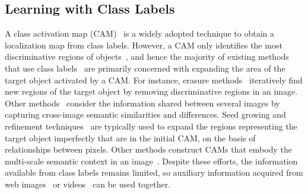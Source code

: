 \documentclass[final]{cvpr}
\begin{document}
\subsection{Learning with Class Labels}\label{W_imagelabel}
A class activation map (CAM)~\cite{zhou2016learning} is a widely adopted technique to obtain a localization map from class labels. However, a CAM only identifies the most discriminative regions of objects~\cite{lee2019ficklenet, lee2019frame}, and hence the majority of existing methods that use class labels~\cite{lee2019frame, lee2019ficklenet, li2019guided, huang2018weakly, ahn2018learning, hou2018self, lee2018robust, Shimoda_2019_ICCV, JiangOAAICCV19, fan2018cian, hong2017weakly} are primarily concerned with expanding the area of the target object activated by a CAM. For instance, erasure methods~\cite{hou2018self, wei2017object} iteratively find new regions of the target object by removing discriminative regions in an image.
Other methods~\cite{fan2018cian, sun2020mining} consider the information shared between several images by capturing cross-image semantic similarities and differences.
Seed growing and refinement techniques~\cite{ahn2018learning, ahn2019weakly, huang2018weakly} are typically used to expand the regions representing the target object imperfectly that are in the initial CAM, on the basis of relationships between pixels.
Other methods construct CAMs that embody the multi-scale semantic context in an image~\cite{lee2019ficklenet, lee2018robust, wei2018revisiting}.
Despite these efforts, the information available from class labels remains limited, so auxiliary information acquired from web images~\cite{shen2018bootstrapping} or videos~\cite{hong2017weakly, lee2019frame} can be used together.
\end{document}

